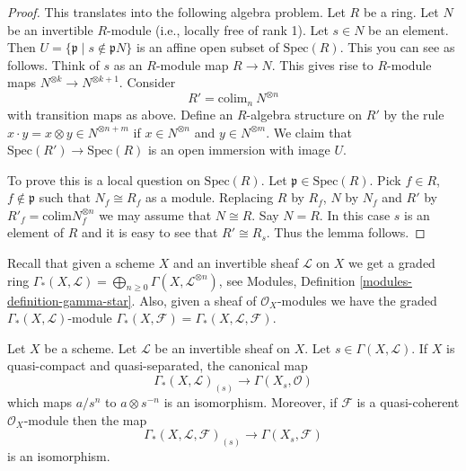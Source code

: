 \begin{proof}
This translates into the following algebra problem.
Let $R$ be a ring. Let $N$ be an invertible $R$-module
(i.e., locally free of rank 1). Let $s \in N$ be an element.
Then $U = \{\mathfrak p \mid s \not \in \mathfrak p N\}$ is
an affine open subset of $\text{Spec}(R)$. This you can see
as follows. Think of $s$ as an $R$-module map $R \to N$.
This gives rise to $R$-module maps $N^{\otimes k} \to N^{\otimes k + 1}$.
Consider
$$
R' = \text{colim}_n\ N^{\otimes n}
$$
with transition maps as above. Define an $R$-algebra structure on $R'$ by
the rule $x \cdot y = x \otimes y \in N^{\otimes n + m}$
if $x \in N^{\otimes n}$ and $y \in N^{\otimes m}$. We claim that
$\text{Spec}(R') \to \text{Spec}(R)$ is an open immersion with
image $U$.

\medskip\noindent
To prove this is a local question on $\text{Spec}(R)$.
Let $\mathfrak p \in \text{Spec}(R)$. Pick $f \in R$,
$f \not \in \mathfrak p$ such that $N_f \cong R_f$ as a module.
Replacing $R$ by $R_f$, $N$ by $N_f$ and $R'$ by
$R'_f = \text{colim} N_f^{\otimes n}$ we may assume that $N \cong R$.
Say $N = R$. In this case $s$ is an element of $R$ and it is
easy to see that $R' \cong R_s$. Thus the lemma follows.
\end{proof}

\noindent
Recall that given a scheme $X$ and an invertible sheaf $\mathcal{L}$
on $X$ we get a graded ring
$\Gamma_*(X, \mathcal{L}) =
\bigoplus_{n \geq 0} \Gamma(X, \mathcal{L}^{\otimes n})$,
see Modules, Definition \ref{modules-definition-gamma-star}.
Also, given a sheaf of $\mathcal{O}_X$-modules we have the
graded $\Gamma_*(X, \mathcal{L})$-module
$\Gamma_*(X, \mathcal{F}) = \Gamma_*(X, \mathcal{L}, \mathcal{F})$.

\begin{lemma}
\label{lemma-invert-s-sections}
Let $X$ be a scheme. Let $\mathcal{L}$ be an invertible sheaf on $X$.
Let $s \in \Gamma(X, \mathcal{L})$.
If $X$ is quasi-compact and quasi-separated, the canonical map
$$
\Gamma_*(X, \mathcal{L})_{(s)}
\longrightarrow
\Gamma(X_s, \mathcal{O})
$$
which maps $a/s^n$ to $a \otimes s^{-n}$ is an isomorphism.
Moreover, if $\mathcal{F}$ is a quasi-coherent $\mathcal{O}_X$-module
then the map
$$
\Gamma_*(X, \mathcal{L}, \mathcal{F})_{(s)}
\longrightarrow
\Gamma(X_s, \mathcal{F})
$$
is an isomorphism.
\end{lemma}

